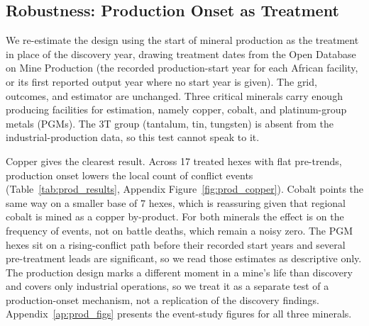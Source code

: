 \subsection{Robustness: Production Onset as Treatment}
\label{sec:production}

We re-estimate the design using the start of mineral production as the
treatment in place of the discovery year, drawing treatment dates from the
Open Database on Mine Production (the recorded production-start year for each
African facility, or its first reported output year where no start year is
given). The grid, outcomes, and estimator are unchanged. Three critical
minerals carry enough producing facilities for estimation, namely copper,
cobalt, and platinum-group metals (PGMs). The 3T group (tantalum, tin, tungsten) is
absent from the industrial-production data, so this test cannot speak to it.

Copper gives the clearest result. Across 17 treated hexes with flat
pre-trends, production onset lowers the local count of conflict events
(Table~\ref{tab:prod_results}, Appendix Figure~\ref{fig:prod_copper}). Cobalt points
the same way on a smaller base of 7 hexes, which is reassuring given that
regional cobalt is mined as a copper by-product. For both minerals the effect
is on the frequency of events, not on battle deaths, which remain a noisy
zero. The PGM hexes sit on a rising-conflict path before their recorded start
years and several pre-treatment leads are significant, so we read those
estimates as descriptive only. The production design marks a different moment
in a mine's life than discovery and covers only industrial operations, so we
treat it as a separate test of a production-onset mechanism, not a
replication of the discovery findings. Appendix~\ref{ap:prod_figs} presents the
event-study figures for all three minerals.

